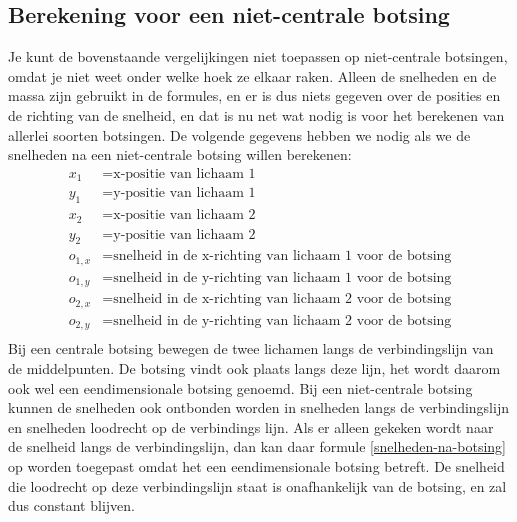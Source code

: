 \documentclass[12pt,a4paper]{article}
\begin{document}
	\subsection{Berekening voor een niet-centrale botsing}
	Je kunt de bovenstaande vergelijkingen niet toepassen op niet-centrale botsingen, omdat je niet weet onder welke hoek ze elkaar raken. Alleen de snelheden en de massa zijn gebruikt in de formules, en er is dus niets gegeven over de posities en de richting van de snelheid, en dat is nu net wat nodig is voor het berekenen van allerlei soorten botsingen. De volgende gegevens hebben we nodig als we de snelheden na een niet-centrale botsing willen berekenen:
	\begin{equation}
		\begin{aligned}
			x_1 &= \text{x-positie van lichaam 1}\\
			y_1 &= \text{y-positie van lichaam 1}\\
			x_2 &= \text{x-positie van lichaam 2}\\
			y_2 &= \text{y-positie van lichaam 2}\\
			o_{1,x} &= \text{snelheid in de x-richting van lichaam 1 voor de botsing}\\
			o_{1,y} &= \text{snelheid in de y-richting van lichaam 1 voor de botsing}\\
			o_{2,x} &= \text{snelheid in de x-richting van lichaam 2 voor de botsing}\\
			o_{2,y} &= \text{snelheid in de y-richting van lichaam 2 voor de botsing}\\
		\end{aligned}
	\end{equation}
	Bij een centrale botsing bewegen de twee lichamen langs de verbindingslijn van de middelpunten. De botsing vindt ook plaats langs deze lijn, het wordt daarom ook wel een eendimensionale botsing genoemd. Bij een niet-centrale botsing kunnen de snelheden ook ontbonden worden in snelheden langs de verbindingslijn en snelheden loodrecht op de verbindings lijn. Als er alleen gekeken wordt naar de snelheid langs de verbindingslijn, dan kan daar formule \eqref{snelheden-na-botsing} op worden toegepast omdat het een eendimensionale botsing betreft. De snelheid die loodrecht op deze verbindingslijn staat is onafhankelijk van de botsing, en zal dus constant blijven.
\end{document}
